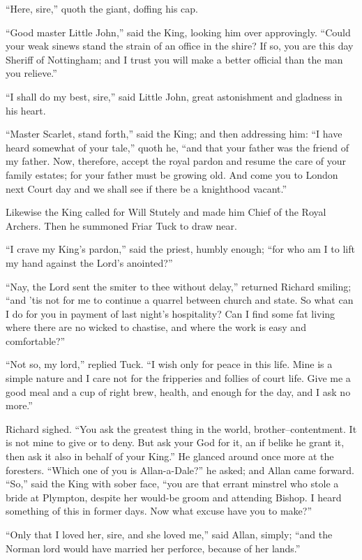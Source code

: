 ``Here, sire,'' quoth the giant, doffing his cap.

``Good master Little John,'' said the King, looking him over
approvingly. ``Could your weak sinews stand the strain of an office in
the shire? If so, you are this day Sheriff of Nottingham; and I trust
you will make a better official than the man you relieve.''

``I shall do my best, sire,'' said Little John, great astonishment and
gladness in his heart.

``Master Scarlet, stand forth,'' said the King; and then addressing him:
``I have heard somewhat of your tale,'' quoth he, ``and that your father
was the friend of my father. Now, therefore, accept the royal pardon and
resume the care of your family estates; for your father must be growing
old. And come you to London next Court day and we shall see if there be
a knighthood vacant.''

Likewise the King called for Will Stutely and made him Chief of the
Royal Archers. Then he summoned Friar Tuck to draw near.

``I crave my King's pardon,'' said the priest, humbly enough; ``for who
am I to lift my hand against the Lord's anointed?''

``Nay, the Lord sent the smiter to thee without delay,'' returned
Richard smiling; ``and 'tis not for me to continue a quarrel between
church and state. So what can I do for you in payment of last night's
hospitality? Can I find some fat living where there are no wicked to
chastise, and where the work is easy and comfortable?''

``Not so, my lord,'' replied Tuck. ``I wish only for peace in this life.
Mine is a simple nature and I care not for the fripperies and follies of
court life. Give me a good meal and a cup of right brew, health, and
enough for the day, and I ask no more.''

Richard sighed. ``You ask the greatest thing in the world,
brother--contentment. It is not mine to give or to deny. But ask your
God for it, an if belike he grant it, then ask it also in behalf of your
King.'' He glanced around once more at the foresters. ``Which one of you
is Allan-a-Dale?'' he asked; and Allan came forward. ``So,'' said the
King with sober face, ``you are that errant minstrel who stole a bride
at Plympton, despite her would-be groom and attending Bishop. I heard
something of this in former days. Now what excuse have you to make?''

``Only that I loved her, sire, and she loved me,'' said Allan, simply;
``and the Norman lord would have married her perforce, because of her
lands.''

